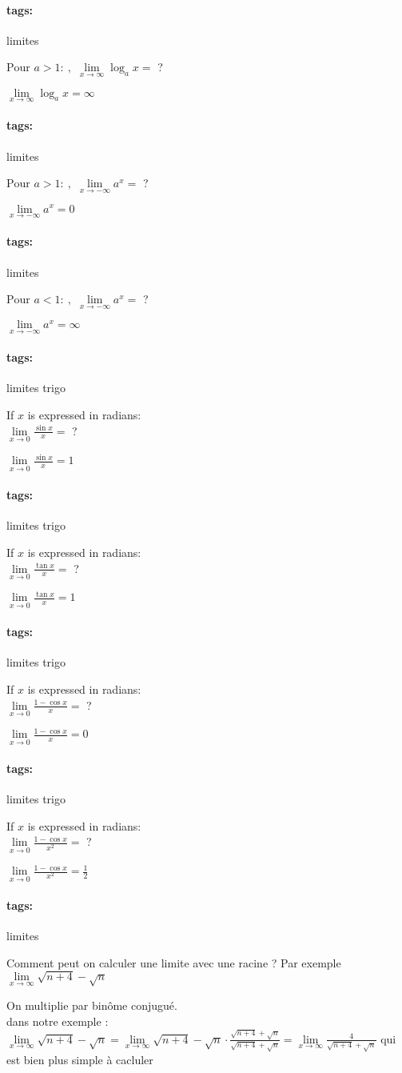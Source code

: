 \documentclass[12pt]{article}
\newcommand*{\xfield}[1]{\begin{mdframed}\centering #1\end{mdframed}\bigskip}
\newenvironment{note}{}{}
\newcommand*{\tags}[1]{\paragraph{tags: }#1}
\begin{document}
\begin{note}
	\tags{limites}
	\xfield{$\mbox{Pour } a > 1:\ ,$ $\lim\limits_{x \to \infty} \log_a x = $ ?}
	\xfield{$\lim\limits_{x \to \infty} \log_a x = \infty$}
\end{note}

\begin{note}
	\tags{limites}
	\xfield{$\mbox{Pour } a > 1:\ ,$ $\lim\limits_{x \to -\infty} a^x = $ ?}
	\xfield{$\lim\limits_{x \to -\infty} a^x = 0$}
\end{note}

\begin{note}
	\tags{limites}
	\xfield{$\mbox{Pour } a < 1:\ ,$ $\lim\limits_{x \to -\infty} a^x =$ ?}
	\xfield{$\lim\limits_{x \to -\infty} a^x = \infty$}
\end{note}

\begin{note}
	\tags{limites trigo}
	\xfield{If $x$ is expressed in radians:\\
	$\lim\limits_{x \to 0} \frac{\sin x}{x} =$ ?}
	\xfield{$\lim\limits_{x \to 0} \frac{\sin x}{x} = 1$}
\end{note}

\begin{note}
	\tags{limites trigo}
	\xfield{If $x$ is expressed in radians:\\
	$\lim\limits_{x \to 0} \frac{\tan x}{x} = $ ?}
	\xfield{$\lim\limits_{x \to 0} \frac{\tan x}{x} = 1$}
\end{note}

\begin{note}
	\tags{limites trigo}
	\xfield{If $x$ is expressed in radians:\\
	$\lim\limits_{x \to 0} \frac{1-\cos x}{x} =$ ?}
	\xfield{$\lim\limits_{x \to 0} \frac{1-\cos x}{x} = 0$}
\end{note}

\begin{note}
	\tags{limites trigo}
	\xfield{If $x$ is expressed in radians:\\
	$\lim\limits_{x \to 0} \frac{1-\cos x}{x^2} =$ ?}
	\xfield{$\lim\limits_{x \to 0} \frac{1-\cos x}{x^2} = \frac{1}{2}$}
\end{note}

\begin{note}
	\tags{limites}
    \xfield{Comment peut on calculer une limite avec une racine ? Par exemple \\ $\lim\limits_{x \to \infty} \sqrt{n+4} - \sqrt{n}$}
    \xfield{On multiplie par binôme conjugué.\\dans notre exemple :\\ $\lim\limits_{x  \to \infty} \sqrt{n+4} - \sqrt{n} = \lim\limits_{x \to \infty} \sqrt{n+4} - \sqrt{n} \cdot \frac{\sqrt{n+4} + \sqrt{n}}{\sqrt{n+4} + \sqrt{n}} = \lim\limits_{x \to \infty} \frac{4}{\sqrt{n+4} + \sqrt{n}}$ qui est bien plus simple à cacluler}
\end{note}
\end{document}
